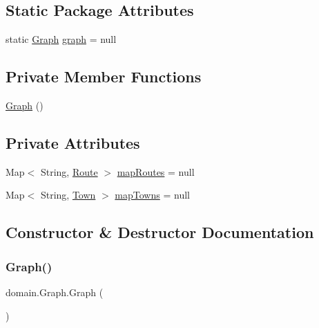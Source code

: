 \subsection*{Static Package Attributes}
\begin{DoxyCompactItemize}
\item 
static \hyperlink{classdomain_1_1_graph}{Graph} \hyperlink{classdomain_1_1_graph_a50ba37beee6b306d2d1044b83d2fff3b}{graph} = null
\end{DoxyCompactItemize}
\subsection*{Private Member Functions}
\begin{DoxyCompactItemize}
\item 
\hyperlink{classdomain_1_1_graph_a656a81cf9b9638f21e9d582f397b7a06}{Graph} ()
\end{DoxyCompactItemize}
\subsection*{Private Attributes}
\begin{DoxyCompactItemize}
\item 
Map$<$ String, \hyperlink{classdomain_1_1_route}{Route} $>$ \hyperlink{classdomain_1_1_graph_a68332cc928e386e174d90ef23190dc7a}{map\+Routes} = null
\item 
Map$<$ String, \hyperlink{classdomain_1_1_town}{Town} $>$ \hyperlink{classdomain_1_1_graph_a4fcf559fd3e3579b189ca0c96cf52318}{map\+Towns} = null
\end{DoxyCompactItemize}


\subsection{Constructor \& Destructor Documentation}
\mbox{\label{classdomain_1_1_graph_a656a81cf9b9638f21e9d582f397b7a06}} 
\subsubsection{\texorpdfstring{Graph()}{Graph()}}
{\footnotesize\ttfamily domain.\+Graph.\+Graph (\begin{DoxyParamCaption}{ }\end{DoxyParamCaption})\hspace{0.3cm}{\ttfamily [private]}}

